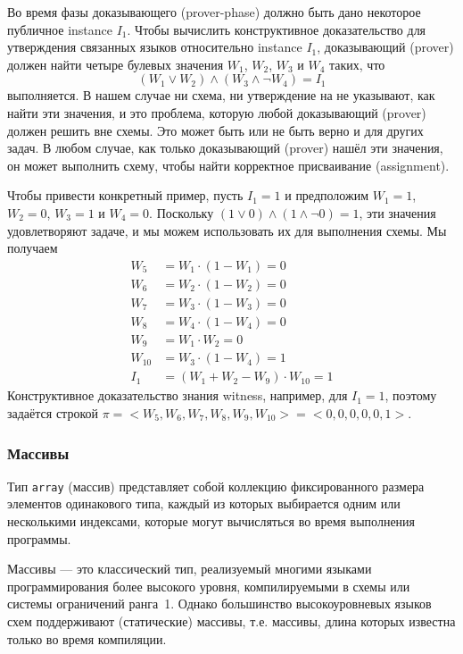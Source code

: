 \begin{example}
Во время фазы доказывающего (prover-phase) должно быть дано некоторое публичное instance $I_1$. Чтобы вычислить конструктивное доказательство для утверждения связанных языков относительно instance $I_1$, доказывающий (prover) должен найти четыре булевых значения $W_1$, $W_2$, $W_3$ и $W_4$ таких, что
$$
\left( W_1 \vee W_2 \right) \wedge (W_3 \wedge \lnot W_4) = I_1
$$ 
выполняется. В нашем случае ни схема, ни утверждение на  не указывают, как найти эти значения, и это проблема, которую любой доказывающий (prover) должен решить вне схемы. Это может быть или не быть верно и для других задач. В любом случае, как только доказывающий (prover) нашёл эти значения, он может выполнить схему, чтобы найти корректное присваивание (assignment).

Чтобы привести конкретный пример, пусть $I_1=1$ и предположим $W_1=1$, $W_2=0$, $W_3=1$ и $W_4=0$. Поскольку
$\left( 1 \vee 0 \right) \wedge (1 \wedge \lnot 0) = 1$, эти значения удовлетворяют задаче, и мы можем использовать их для выполнения схемы. Мы получаем
\begin{align*}
W_5 & = W_1 \cdot (1- W_1) = 0\\
W_6 & = W_2 \cdot (1- W_2) = 0 \\
W_7 & = W_3 \cdot (1- W_3) = 0 \\
W_8 & = W_4 \cdot (1- W_4) = 0 \\
W_9 & = W_1\cdot W_2 = 0\\
W_{10} & = W_3 \cdot (1-W_4) = 1\\
I_1 & = (W_1 + W_2 - W_9) \cdot W_{10} = 1
\end{align*}
Конструктивное доказательство знания witness, например, для $I_1=1$, поэтому задаётся строкой $\pi=<W_5,W_6,W_7,W_8,W_9,W_{10}>=<0,0,0,0,0,1>$.
\end{example}
\subsubsection{Массивы} Тип \texttt{array} (массив) представляет собой коллекцию фиксированного размера элементов одинакового типа, каждый из которых выбирается одним или несколькими индексами, которые могут вычисляться во время выполнения программы.

Массивы --- это классический тип, реализуемый многими языками программирования более высокого уровня, компилируемыми в схемы или системы ограничений ранга~1. Однако большинство высокоуровневых языков схем поддерживают  (статические) массивы, т.е. массивы, длина которых известна только во время компиляции.

